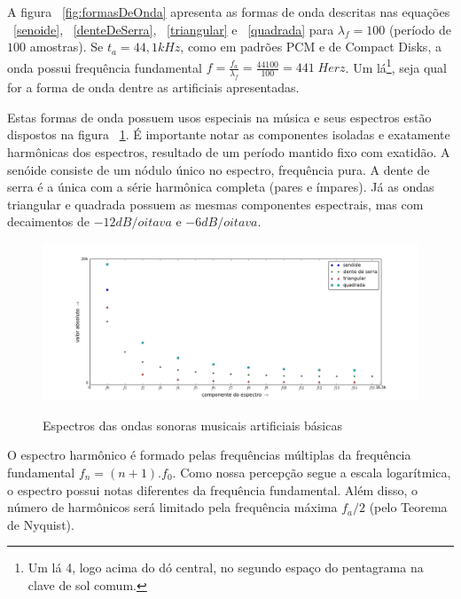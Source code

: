 A figura ~\ref{fig:formasDeOnda} apresenta
as formas de onda descritas nas equações ~\ref{senoide}, ~\ref{denteDeSerra}, ~\ref{triangular} e ~\ref{quadrada} para $\lambda_f=100$ (período
de $100$ amostras).
Se $t_a=44,1 kHz$, como em padrões PCM e de Compact Disks, a onda possui frequência fundamental $f=\frac{f_a}{\lambda_f}=\frac{44100}{100} = 441 \; Herz $. Um lá\footnote{Um lá 4, logo acima do dó central, no segundo espaço do pentagrama na clave de sol comum.}, seja qual for a forma de onda dentre as artificiais apresentadas.

Estas formas de onda possuem usos especiais na música e seus espectros estão dispostos na figura ~\ref{fig:espectroDeOndas}. É importante notar as componentes isoladas e exatamente harmônicas dos espectros,
resultado de um período mantido fixo com exatidão. A senóide consiste de um nódulo único no espectro, frequência pura. A dente de serra é a única com a série harmônica completa (pares e ímpares). Já as ondas triangular e quadrada possuem as mesmas componentes espectrais, mas com decaimentos de $-12dB/oitava$ e $-6dB/oitava$.

\begin{figure}[h!]
    \centering
    \caption{Espectros das ondas sonoras musicais artificiais básicas}
        \includegraphics[width=\textwidth]{figuras/espectroDeOndas5b}
        \label{fig:espectroDeOndas}
\end{figure}


O espectro harmônico é formado pelas frequências múltiplas da frequência fundamental $f_n=(n+1).f_0$. Como nossa percepção segue a escala logarítmica, o espectro possui notas diferentes da frequência fundamental. Além disso, o número de harmônicos será limitado pela frequência máxima $f_a/2$ (pelo Teorema de Nyquist). 

